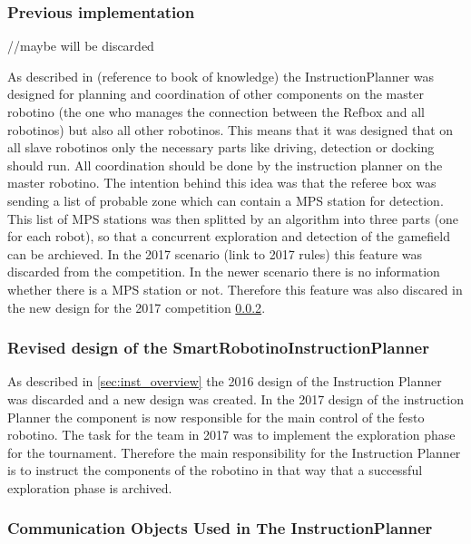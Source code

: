 \subsubsection{Previous implementation}

//maybe will be discarded

As described in (reference to book of knowledge) the InstructionPlanner was designed for planning and coordination of other components on the master robotino (the one who manages the connection between the Refbox and all robotinos) but also all other robotinos. This means that it was designed that on all slave robotinos only the necessary parts like driving, detection or docking should run. All coordination should be done by the instruction planner on the master robotino. The intention behind this idea was that the referee box was sending a list of probable zone which can contain a MPS station for detection. This list of MPS stations was then splitted by an algorithm into three parts (one for each robot), so that a concurrent exploration and detection of the gamefield can be archieved. In the 2017 scenario (link to 2017 rules) this feature was discarded from the competition. In the newer scenario there is no information whether there is a MPS station or not. Therefore this feature was also discared in the new design for the 2017 competition \ref{sec:new_design}.  \\



\subsubsection{Revised design of the SmartRobotinoInstructionPlanner}
\label{sec:new_design}

As described in \ref{sec:inst_overview} the 2016 design of the Instruction Planner was discarded and a new design was created. In the 2017 design of the instruction Planner the component is now responsible for the main control of the festo robotino. The task for the team in 2017 was to implement the exploration phase for the tournament. Therefore the main responsibility for the Instruction Planner is to instruct the components of the robotino in that way that a successful exploration phase is archived.     



\subsubsection{Communication Objects Used in The InstructionPlanner}


